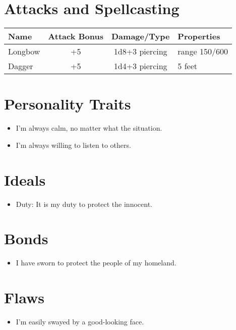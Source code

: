 \documentclass[12pt]{article}
\begin{document}
\section{Attacks and Spellcasting}
\begin{tabularx}{\linewidth}{lccX}
\toprule
\textbf{Name} & \textbf{Attack Bonus} & \textbf{Damage/Type} & \textbf{Properties} \\
\midrule
Longbow & +5 & 1d8+3 piercing & range 150/600 \\
Dagger & +5 & 1d4+3 piercing & 5 feet \\
\bottomrule
\end{tabularx}

\section{Personality Traits}
\begin{itemize}[leftmargin=*]
\item I'm always calm, no matter what the situation.
\item I'm always willing to listen to others.
\end{itemize}

\section{Ideals}
\begin{itemize}[leftmargin=*]
\item Duty: It is my duty to protect the innocent.
\end{itemize}

\section{Bonds}
\begin{itemize}[leftmargin=*]
\item I have sworn to protect the people of my homeland.
\end{itemize}

\section{Flaws}
\begin{itemize}[leftmargin=*]
\item I'm easily swayed by a good-looking face.
\end{itemize}
\end{document}
